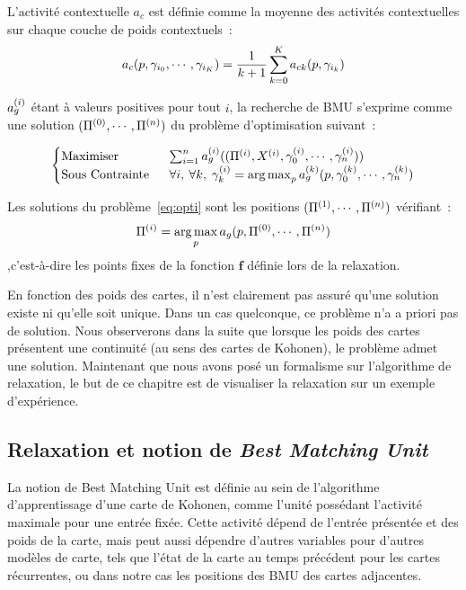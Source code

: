 \documentclass[../main]{subfiles}
\begin{document}
L'activité contextuelle $a_c$ est définie comme la moyenne des activités contextuelles sur chaque couche de poids contextuels~:
\begin{equation}
	a_c(p, \gamma_{i_0}, \cdots, \gamma_{i_K}) = \frac{1}{k+1}\sum_{k=0}^{K}{a_{ck}(p, \gamma_{i_k})}
\end{equation}

$a_g^{({i})}$ étant à valeurs positives pour tout $i$, la recherche de BMU s'exprime comme une solution $(\Pi^{({0})}, \cdots, \Pi^{({n})})$ du problème d'optimisation suivant~:

\begin{equation}\label{eq:opti}
	\begin{cases}
	\text{Maximiser}\;& \sum_{i = 1}^n a_g^{({i})}((\Pi^{({i})},X^{({i})},\gamma_0^{({i})}, \cdots, \gamma_n^{({i})})) \\
	\text{Sous Contrainte }\; &\forall i,\:\forall k, \; \gamma_k^{({i})} = \operatorname*{arg\,max}_{p}a_g^{({k})}(p,\gamma_0^{({k})}, \cdots, \gamma_n^{({k})})
	\end{cases}
\end{equation}

Les solutions du problème~\ref{eq:opti} sont les positions $(\Pi^{({1})}, \cdots, \Pi^{({n})})$ vérifiant~:
$$\Pi^{({i})} = \operatorname*{arg\,max}_p a_g(p, \Pi^{({0})}, \cdots, \Pi^{({n})})$$,c'est-à-dire les points fixes de la fonction $\mathbf{f}$ définie lors de la relaxation.

En fonction des poids des cartes, il n'est clairement pas assuré qu'une solution existe ni qu'elle soit unique. 
Dans un cas quelconque, ce problème n'a a priori pas de solution.
Nous observerons dans la suite que lorsque les poids des cartes présentent une continuité (au sens des cartes de Kohonen), le problème admet une solution.
Maintenant que nous avons posé un formalisme sur l'algorithme de relaxation, le but de ce chapitre est de visualiser la relaxation sur un exemple d'expérience.

\subsection{Relaxation et notion de \emph{Best Matching Unit}}

La notion de Best Matching Unit est définie au sein de l'algorithme d'apprentissage d'une carte de Kohonen, comme l'unité possédant l'activité maximale pour une entrée fixée. 
Cette activité dépend de l'entrée présentée et des poids de la carte, mais peut aussi dépendre d'autres variables pour d'autres modèles de carte, tels que l'état de la carte au temps précédent pour les cartes récurrentes, ou dans notre cas les positions des BMU des cartes adjacentes.
\end{document}
